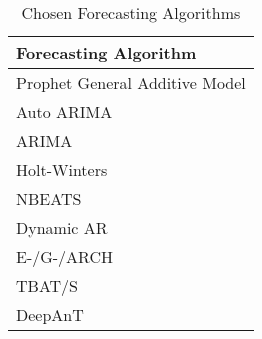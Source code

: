 \begin{table}[h]\centering
        \begin{tabular}{l}
            Forecasting Algorithm                                                     \\\midrule         
            Prophet General Additive Model                                            \\\addlinespace
            Auto ARIMA                                                                \\\addlinespace
            ARIMA~\cite{braei}                                                        \\\addlinespace
            Holt-Winters                                                              \\\addlinespace
            NBEATS                                                                    \\\addlinespace
            Dynamic AR                                                                \\\addlinespace
            E-/G-/ARCH                                                                \\\addlinespace
            TBAT/S                                                                    \\\addlinespace
            DeepAnT                                                                   \\
        \end{tabular}
    \caption{Chosen Forecasting Algorithms}\label{tab:chosen-forecasting-algo}
\end{table}

